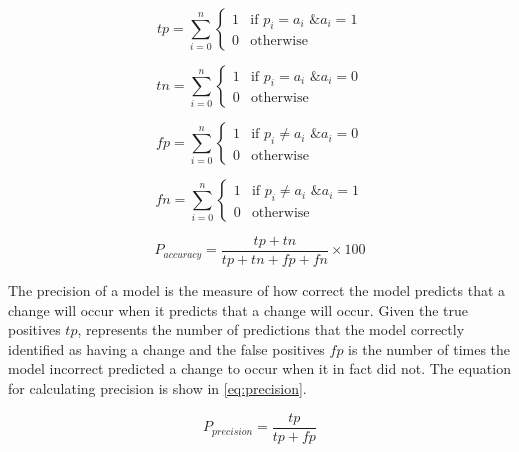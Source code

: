 \begin{equation}
\label{eq:true_positive}
tp = \sum_{i=0}^{n}\left\{\begin{matrix}
1 & \text{if } p_i = a_i \text{ \& } a_i = 1\\ 
0 & \text{otherwise}
\end{matrix}\right.
\end{equation}

\begin{equation} 
\label{eq:true_negative}
tn = \sum_{i=0}^{n}\left\{\begin{matrix}
1 & \text{if } p_i = a_i \text{ \& } a_i = 0\\ 
0 & \text{otherwise}
\end{matrix}\right.
\end{equation}

\begin{equation}
\label{eq:false_positive}
fp = \sum_{i=0}^{n}\left\{\begin{matrix}
1 & \text{if } p_i \neq a_i \text{ \& } a_i = 0\\ 
0 & \text{otherwise}
\end{matrix}\right.
\end{equation}

\begin{equation}
\label{eq:false_negative}
fn = \sum_{i=0}^{n}\left\{\begin{matrix}
1 & \text{if } p_i \neq a_i \text{ \& } a_i = 1\\ 
0 & \text{otherwise}
\end{matrix}\right.
\end{equation}

\begin{equation}
\label{eq:prediction_accuracy}
P_{accuracy} = \frac{tp+tn}{tp+tn+fp+fn} \times 100
\end{equation}

The precision of a model is the measure of how correct the model predicts that a change will occur when it predicts that a change will occur. Given the true positives $tp$, represents the number of predictions that the model correctly identified as having a change and the false positives $fp$ is the number of times the model incorrect predicted a change to occur when it in fact did not. The equation for calculating precision is show in \autoref{eq:precision}.



\begin{equation} 
\label{eq:precision}
P_{precision} = \frac{tp}{tp+fp}
\end{equation}

